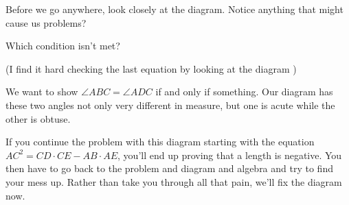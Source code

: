 Before we go anywhere, look closely at the diagram. Notice anything that might cause us problems?


Which condition isn't met?

(I find it hard checking the last equation by looking at the diagram  )












We want to show $\angle ABC = \angle ADC$ if and only if something. Our diagram has these two angles not only very different in measure, but one is acute while the other is obtuse.

If you continue the problem with this diagram starting with the equation $AC^2 = CD \cdot CE - AB \cdot AE$, you'll end up proving that a length is negative. You then have to go back to the problem and diagram and algebra and try to find your mess up. Rather than take you through all that pain, we'll fix the diagram now.

